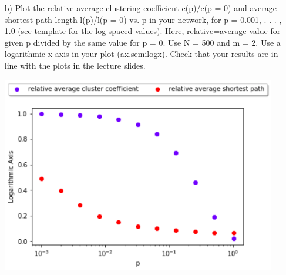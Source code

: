 \documentclass[a4paper,12pt]{article}
\begin{document}
\begin{itemize}
\item[b) ] Plot the relative average clustering coefficient c(p)/c(p = 0) and average shortest
path length l(p)/l(p = 0) vs. p in your network, for p = 0.001, . . . , 1.0 (see template for
the log-spaced values). Here, relative=average value for given p divided by the same value
for p = 0. Use N = 500 and m = 2. Use a logarithmic x-axis in your plot (ax.semilogx).
Check that your results are in line with the plots in the lecture slides.

\begin{minipage}{\linewidth}
\centering
\includegraphics[width=12cm]{assets/relative.png}
\end{minipage}\hfill
\end{itemize}
\end{document}
